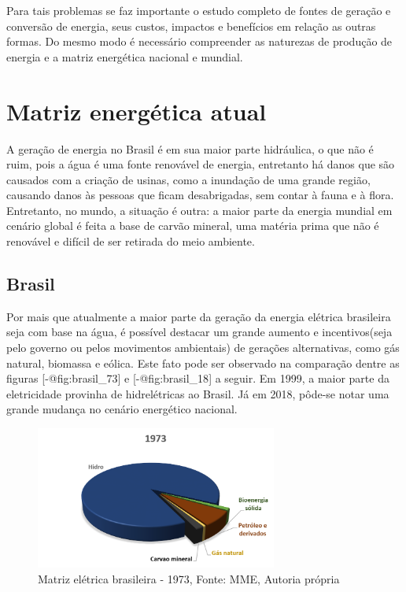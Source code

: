 \documentclass[
]{article}
\begin{document}
Para tais problemas se faz importante o estudo completo de fontes de
geração e conversão de energia, seus custos, impactos e benefícios em
relação as outras formas. Do mesmo modo é necessário compreender as
naturezas de produção de energia e a matriz energética nacional e
mundial.

\hypertarget{matriz-energuxe9tica-atual}{%
\section{Matriz energética atual}\label{matriz-energuxe9tica-atual}}

A geração de energia no Brasil é em sua maior parte hidráulica, o que
não é ruim, pois a água é uma fonte renovável de energia, entretanto há
danos que são causados com a criação de usinas, como a inundação de uma
grande região, causando danos às pessoas que ficam desabrigadas, sem
contar à fauna e à flora. Entretanto, no mundo, a situação é outra: a
maior parte da energia mundial em cenário global é feita a base de
carvão mineral, uma matéria prima que não é renovável e difícil de ser
retirada do meio ambiente.

\hypertarget{sec:matriz_br}{%
\subsection{Brasil}\label{sec:matriz_br}}

Por mais que atualmente a maior parte da geração da energia elétrica
brasileira seja com base na água, é possível destacar um grande aumento
e incentivos(seja pelo governo ou pelos movimentos ambientais) de
gerações alternativas, como gás natural, biomassa e eólica. Este fato
pode ser observado na comparação dentre as figuras
{[}-@fig:brasil\_73{]} e {[}-@fig:brasil\_18{]} a seguir. Em 1999, a
maior parte da eletricidade provinha de hidrelétricas ao Brasil. Já em
2018, pôde-se notar uma grande mudança no cenário energético nacional.

\begin{figure}
\hypertarget{fig:brasil_73}{%
\centering
\includegraphics[width=3.125in,height=\textheight]{img/matriz/brasil_73.png}
\caption{Matriz elétrica brasileira - 1973, Fonte: MME, Autoria
própria}\label{fig:brasil_73}
}
\end{figure}
\end{document}
